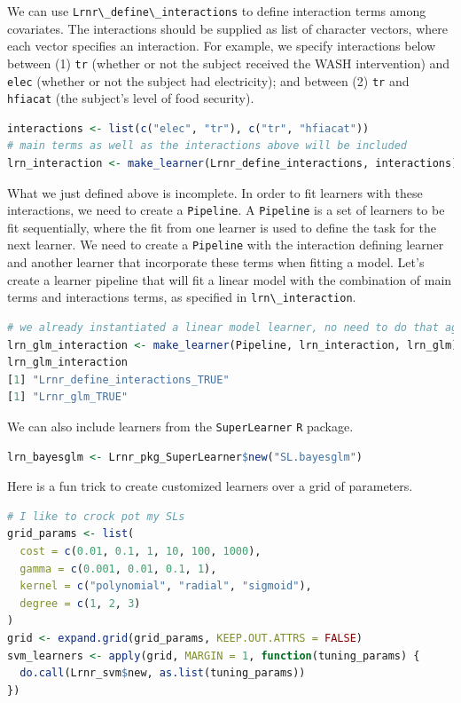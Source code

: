 \documentclass[
  12pt, krantz2,
]{book}
\newcommand{\passthrough}[1]{#1}
\theoremstyle{definition}
\theoremstyle{definition}
\theoremstyle{definition}
\newcommand{\1}{\mathbbm{1}}
\begin{document}
We can use \passthrough{\lstinline!Lrnr\_define\_interactions!} to define interaction terms among
covariates. The interactions should be supplied as list of character vectors,
where each vector specifies an interaction. For example, we specify
interactions below between (1) \passthrough{\lstinline!tr!} (whether or not the subject received the
WASH intervention) and \passthrough{\lstinline!elec!} (whether or not the subject had electricity); and
between (2) \passthrough{\lstinline!tr!} and \passthrough{\lstinline!hfiacat!} (the subject's level of food security).

\begin{lstlisting}[language=R]
interactions <- list(c("elec", "tr"), c("tr", "hfiacat"))
# main terms as well as the interactions above will be included
lrn_interaction <- make_learner(Lrnr_define_interactions, interactions)
\end{lstlisting}

What we just defined above is incomplete. In order to fit learners with these
interactions, we need to create a \passthrough{\lstinline!Pipeline!}. A \passthrough{\lstinline!Pipeline!} is a set of learners
to be fit sequentially, where the fit from one learner is used to define the
task for the next learner. We need to create a \passthrough{\lstinline!Pipeline!} with the interaction
defining learner and another learner that incorporate these terms when fitting
a model. Let's create a learner pipeline that will fit a linear model with the
combination of main terms and interactions terms, as specified in
\passthrough{\lstinline!lrn\_interaction!}.

\begin{lstlisting}[language=R]
# we already instantiated a linear model learner, no need to do that again
lrn_glm_interaction <- make_learner(Pipeline, lrn_interaction, lrn_glm)
lrn_glm_interaction
[1] "Lrnr_define_interactions_TRUE"
[1] "Lrnr_glm_TRUE"
\end{lstlisting}

We can also include learners from the \passthrough{\lstinline!SuperLearner!} \passthrough{\lstinline!R!} package.

\begin{lstlisting}[language=R]
lrn_bayesglm <- Lrnr_pkg_SuperLearner$new("SL.bayesglm")
\end{lstlisting}

Here is a fun trick to create customized learners over a grid of parameters.

\begin{lstlisting}[language=R]
# I like to crock pot my SLs
grid_params <- list(
  cost = c(0.01, 0.1, 1, 10, 100, 1000),
  gamma = c(0.001, 0.01, 0.1, 1),
  kernel = c("polynomial", "radial", "sigmoid"),
  degree = c(1, 2, 3)
)
grid <- expand.grid(grid_params, KEEP.OUT.ATTRS = FALSE)
svm_learners <- apply(grid, MARGIN = 1, function(tuning_params) {
  do.call(Lrnr_svm$new, as.list(tuning_params))
})
\end{lstlisting}
\end{document}
